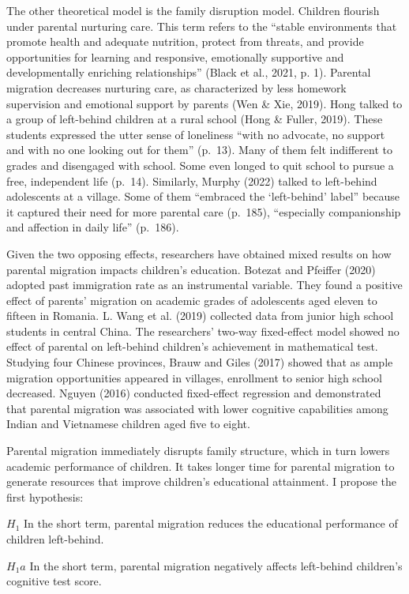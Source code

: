\documentclass[
  man,floatsintext]{apa7}
\begin{document}
The other theoretical model is the family disruption model. Children flourish under parental nurturing care. This term refers to the ``stable environments that promote health and adequate nutrition, protect from threats, and provide opportunities for learning and responsive, emotionally supportive and developmentally enriching relationships'' (Black et al., 2021, p. 1). Parental migration decreases nurturing care, as characterized by less homework supervision and emotional support by parents (Wen \& Xie, 2019). Hong talked to a group of left-behind children at a rural school (Hong \& Fuller, 2019). These students expressed the utter sense of loneliness ``with no advocate, no support and with no one looking out for them'' (p.~13). Many of them felt indifferent to grades and disengaged with school. Some even longed to quit school to pursue a free, independent life (p.~14). Similarly, Murphy (2022) talked to left-behind adolescents at a village. Some of them ``embraced the `left-behind' label'' because it captured their need for more parental care (p.~185), ``especially companionship and affection in daily life'' (p.~186).

Given the two opposing effects, researchers have obtained mixed results on how parental migration impacts children's education. Botezat and Pfeiffer (2020) adopted past immigration rate as an instrumental variable. They found a positive effect of parents' migration on academic grades of adolescents aged eleven to fifteen in Romania. L. Wang et al. (2019) collected data from junior high school students in central China. The researchers' two-way fixed-effect model showed no effect of parental on left-behind children's achievement in mathematical test. Studying four Chinese provinces, Brauw and Giles (2017) showed that as ample migration opportunities appeared in villages, enrollment to senior high school decreased. Nguyen (2016) conducted fixed-effect regression and demonstrated that parental migration was associated with lower cognitive capabilities among Indian and Vietnamese children aged five to eight.

Parental migration immediately disrupts family structure, which in turn lowers academic performance of children. It takes longer time for parental migration to generate resources that improve children's educational attainment. I propose the first hypothesis:

\(H_1\) In the short term, parental migration reduces the educational performance of children left-behind.

\(H_1a\) In the short term, parental migration negatively affects left-behind children's cognitive test score.
\end{document}
